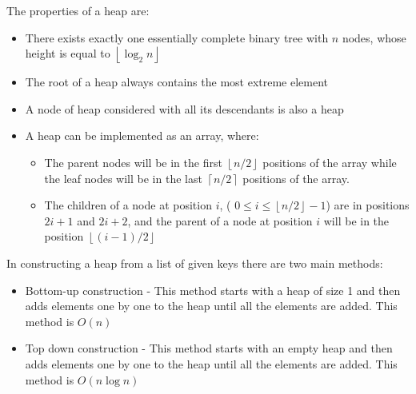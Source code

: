 \documentclass[12pt letter]{report}
\begin{document}
The properties of a heap are:
\begin{itemize}
  \item There exists exactly one essentially complete binary tree with $n$ nodes, whose height is equal to $\left\lfloor
          \log_2 n\right\rfloor$
  \item The root of a heap always contains the most extreme element
  \item A node of heap considered with all its descendants is also a heap
  \item A heap can be implemented as an array, where:
        \begin{itemize}
          \item The parent nodes will be in the first $\left\lfloor n / 2 \right\rfloor$ positions of the array while the
                leaf nodes will be in the last $\left\lceil n / 2 \right\rceil$ positions of the array.
          \item The children of a node at position $i$, ( $0 \leq i \leq \left\lfloor n / 2 \right\rfloor - 1$) are in
                positions $2i + 1$ and $2i + 2$, and the parent of a node at position $i$ will be in the position
                $\left\lfloor (i - 1) / 2 \right\rfloor$
        \end{itemize}
\end{itemize}

In constructing a heap from a list of given keys there are two main methods:
\begin{itemize}
  \item Bottom-up construction - This method starts with a heap of size 1 and then adds elements one by one to the heap
        until all the elements are added. This method is $O(n)$
  \item Top down construction - This method starts with an empty heap and then adds elements one by one to the heap until
        all the elements are added. This method is $O(n \log n)$
\end{itemize}
\end{document}
